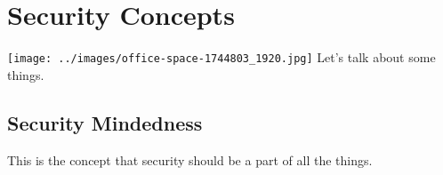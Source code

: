 \chapter{Security Concepts}

\texttt{[image: ../images/office-space-1744803\_1920.jpg]}
\justify{}
Let's talk about some things.

\section{Security Mindedness}
\justify{}
This is the concept that security should be a part of all the things. 
